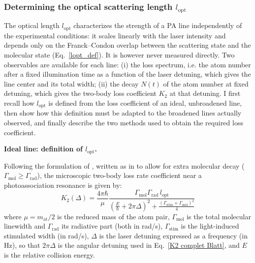 \subsubsection{Determining the optical scattering length $l_{\text{opt}}$}
\label{sec:determining_lopt}

The optical length $l_{\text{opt}}$ characterizes the strength of a PA line
independently of the experimental conditions: it scales linearly with the laser
intensity and depends only on the Franck--Condon overlap between the scattering
state and the molecular state (Eq.~\ref{lopt_def}). It is however never measured
directly. Two observables are available for each line: (i) the loss spectrum,
i.e. the atom number after a fixed illumination time as a function of the laser
detuning, which gives the line center and its total width; (ii) the decay $N(t)$
of the atom number at fixed detuning, which gives the two-body loss coefficient
$K_2$ at that detuning. I first recall how $l_{\text{opt}}$ is defined from the
loss coefficient of an ideal, unbroadened line, then show how this definition
must be adapted to the broadened lines actually observed, and finally describe
the two methods used to obtain the required loss coefficient.

\textbf{Ideal line: definition of $l_{\text{opt}}$.}

Following the formulation of \cite{zelevinsky_narrow_2006}, written as in \cite{blatt_systematic_2011} to allow for
extra molecular decay ($\Gamma_{\text{mol}}\geq\Gamma_{\text{rad}}$), the microscopic
two-body loss rate coefficient near a photoassociation resonance is given by:
\begin{equation}
    K_2(\Delta) = \frac{4\pi\hbar}{\mu} \frac{\Gamma_{\text{mol}}\Gamma_{\text{rad}} \, l_{\text{opt}}}{\left(\frac{E}{\hbar} + 2\pi\Delta\right)^2 + \frac{(\Gamma_{\text{stim}} + \Gamma_{\text{mol}})^2}{4}}
\label{eq:zelevinsky_K2}
\end{equation}
where $\mu = m_{\text{at}}/2$ is the reduced mass of the atom pair,
$\Gamma_{\text{mol}}$ is the total molecular linewidth and $\Gamma_{\text{rad}}$ its radiative part (both in rad/s),
$\Gamma_{\text{stim}}$ is the light-induced stimulated width (in rad/s), $\Delta$
is the laser detuning expressed as a frequency (in Hz), so that $2\pi\Delta$ is the angular
detuning used in Eq.~\ref{K2 complet Blatt}, and $E$ is the relative collision energy.

